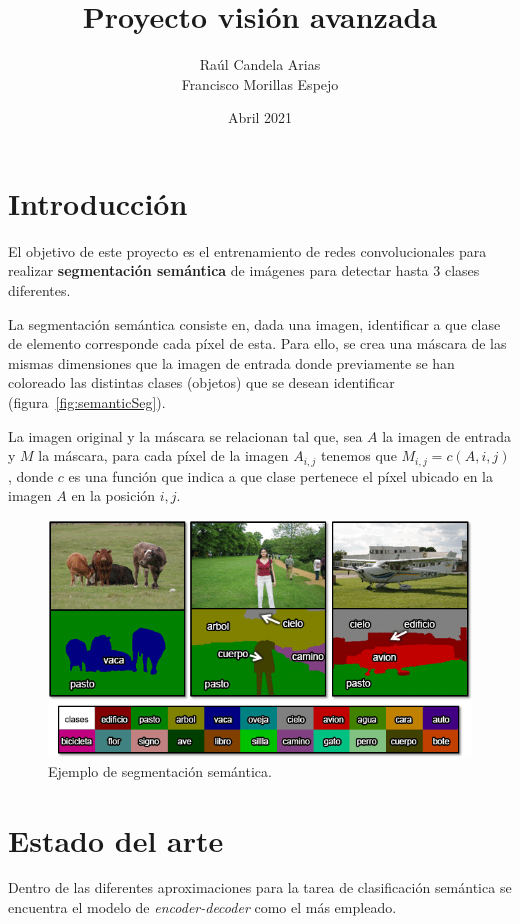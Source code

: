 \documentclass[a4paper]{article}
\title{Proyecto visión avanzada}
\author{Raúl Candela Arias \\ Francisco Morillas Espejo}
\date{Abril 2021}
\newcommand\imgScale {0.6}
\begin{document}
\maketitle

\section{Introducción}

El objetivo de este proyecto es el entrenamiento de redes convolucionales para realizar \textbf{segmentación semántica} de imágenes para detectar hasta 3 clases diferentes.
\newline

La segmentación semántica consiste en, dada una imagen, identificar a que clase de elemento corresponde cada píxel de esta.
Para ello, se crea una máscara de las mismas dimensiones que la imagen de entrada donde previamente se han coloreado las distintas clases (objetos) que se desean identificar (figura~\ref{fig:semanticSeg}).
\newline

La imagen original y la máscara se relacionan tal que, sea $A$ la imagen de entrada y $M$ la máscara, para cada píxel de la imagen $A_{i,j}$ tenemos que $M_{i,j} = c(A,i,j)$, donde $c$ es una función que indica a que clase pertenece el píxel ubicado en la imagen $A$ en la posición $i,j$.
\begin{figure}[htbp]
    \centering
    \includegraphics[scale=\imgScale]{img/EjSegSem.png}
    \caption{\small Ejemplo de segmentación semántica. \cite{Ref1}}
    \label{fig:my_label}
\end{figure}


\section{Estado del arte}
Dentro de las diferentes aproximaciones para la tarea de clasificación semántica se encuentra el modelo de \textit{encoder-decoder} como el más empleado.
\newline
\end{document}
